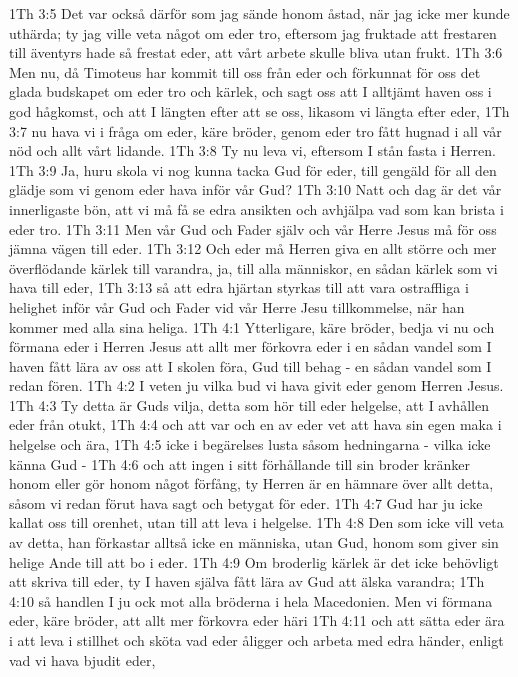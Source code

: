 1Th 3:5  Det var också därför som jag sände honom åstad, när jag icke mer kunde uthärda; ty jag ville veta något om eder tro, eftersom jag fruktade att frestaren till äventyrs hade så frestat eder, att vårt arbete skulle bliva utan frukt.
1Th 3:6  Men nu, då Timoteus har kommit till oss från eder och förkunnat för oss det glada budskapet om eder tro och kärlek, och sagt oss att I alltjämt haven oss i god hågkomst, och att I längten efter att se oss, likasom vi längta efter eder,
1Th 3:7  nu hava vi i fråga om eder, käre bröder, genom eder tro fått hugnad i all vår nöd och allt vårt lidande.
1Th 3:8  Ty nu leva vi, eftersom I stån fasta i Herren.
1Th 3:9  Ja, huru skola vi nog kunna tacka Gud för eder, till gengäld för all den glädje som vi genom eder hava inför vår Gud?
1Th 3:10  Natt och dag är det vår innerligaste bön, att vi må få se edra ansikten och avhjälpa vad som kan brista i eder tro.
1Th 3:11  Men vår Gud och Fader själv och vår Herre Jesus må för oss jämna vägen till eder.
1Th 3:12  Och eder må Herren giva en allt större och mer överflödande kärlek till varandra, ja, till alla människor, en sådan kärlek som vi hava till eder,
1Th 3:13  så att edra hjärtan styrkas till att vara ostraffliga i helighet inför vår Gud och Fader vid vår Herre Jesu tillkommelse, när han kommer med alla sina heliga.
1Th 4:1  Ytterligare, käre bröder, bedja vi nu och förmana eder i Herren Jesus att allt mer förkovra eder i en sådan vandel som I haven fått lära av oss att I skolen föra, Gud till behag - en sådan vandel som I redan fören.
1Th 4:2  I veten ju vilka bud vi hava givit eder genom Herren Jesus.
1Th 4:3  Ty detta är Guds vilja, detta som hör till eder helgelse, att I avhållen eder från otukt,
1Th 4:4  och att var och en av eder vet att hava sin egen maka i helgelse och ära,
1Th 4:5  icke i begärelses lusta såsom hedningarna - vilka icke känna Gud -
1Th 4:6  och att ingen i sitt förhållande till sin broder kränker honom eller gör honom något förfång, ty Herren är en hämnare över allt detta, såsom vi redan förut hava sagt och betygat för eder.
1Th 4:7  Gud har ju icke kallat oss till orenhet, utan till att leva i helgelse.
1Th 4:8  Den som icke vill veta av detta, han förkastar alltså icke en människa, utan Gud, honom som giver sin helige Ande till att bo i eder.
1Th 4:9  Om broderlig kärlek är det icke behövligt att skriva till eder, ty I haven själva fått lära av Gud att älska varandra;
1Th 4:10  så handlen I ju ock mot alla bröderna i hela Macedonien. Men vi förmana eder, käre bröder, att allt mer förkovra eder häri
1Th 4:11  och att sätta eder ära i att leva i stillhet och sköta vad eder åligger och arbeta med edra händer, enligt vad vi hava bjudit eder,
